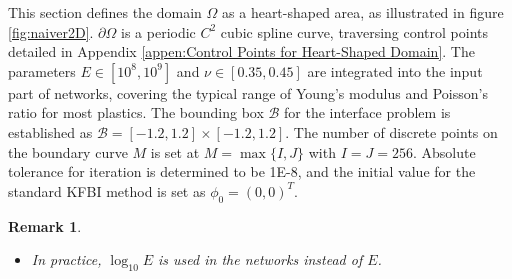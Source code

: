\documentclass{article}
\newtheorem{remark}{Remark}
\begin{document}
This section defines the domain $\Omega$ as a heart-shaped area, as illustrated in figure \ref{fig:naiver2D}. $\partial \Omega$ is a periodic $C^2$ cubic spline curve, traversing control points detailed in Appendix \ref{appen:Control Points for Heart-Shaped Domain}. The parameters $E \in [10^8, 10^9]$ and $\nu \in [0.35, 0.45]$ are integrated into the input part of networks, covering the typical range of Young's modulus and Poisson's ratio for most plastics. The bounding box $\mathcal{B}$ for the interface problem is established as $\mathcal{B} = [-1.2,1.2] \times [-1.2,1.2]$. The number of discrete points on the boundary curve $M$ is set at $M = \max\{I, J\}$ with $I = J = 256$. Absolute tolerance for iteration is determined to be 1E-8, and the initial value for the standard KFBI method is set as $\phi_0 = (0, 0)^T$.

\begin{remark}
\begin{itemize}
\item In practice, $\log_{10} E$ is used in the networks instead of $E$.
\end{itemize}
\end{remark}
\end{document}
